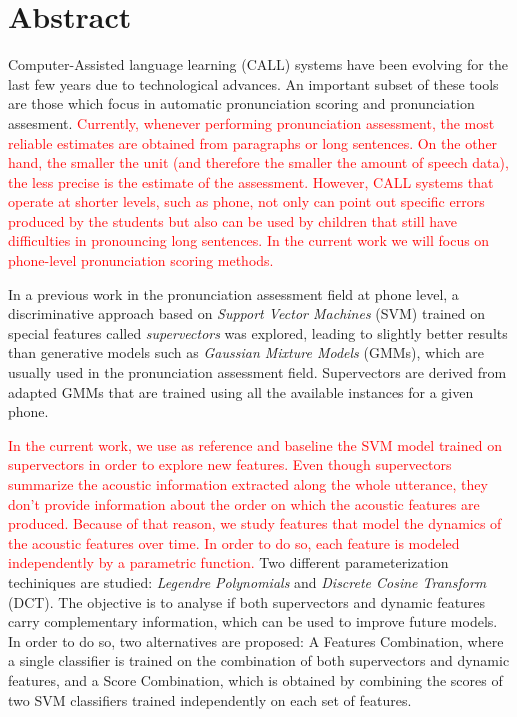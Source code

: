 \chapter*{Abstract}

\noindent
Computer-Assisted language learning (CALL) systems have been
evolving for the last few years due to
technological advances. An important subset of these tools are those which focus in
automatic pronunciation scoring and pronunciation assesment.
\textcolor{red}{
  Currently, whenever performing pronunciation assessment, the most reliable estimates are
  obtained from paragraphs or long sentences. On the other hand, the smaller the unit
  (and therefore the smaller the amount of speech data), the less precise is
  the estimate of the assessment.
  However, CALL systems that operate at shorter levels, such
  as phone, not only can point out specific errors produced by the students but also
  can be used by children that still have difficulties in pronouncing long sentences.
  In the current work we will focus on phone-level pronunciation scoring methods.
}

In a previous work in the pronunciation assessment field at phone level, a discriminative
approach based on \textit{Support Vector Machines} (SVM) trained on special features
called \textit{supervectors} was explored, leading to slightly better results than
generative models such as \textit{Gaussian Mixture Models} (GMMs), which are usually
used in the pronunciation assessment field. Supervectors are derived from
adapted GMMs that are trained using all the available instances for a given phone.

\textcolor{red}{
In the current work, we use as reference and baseline the SVM model
trained on supervectors in order to explore new features. Even though supervectors
summarize the acoustic information extracted along the whole utterance,
they don't provide information about the order on which the acoustic features are
produced. Because of that reason, we study features that model the dynamics of the
acoustic features over time. In order to do so, each feature is modeled independently
by a parametric function.}
Two different parameterization techiniques are studied:
\textit{Legendre Polynomials} and \textit{Discrete Cosine Transform} (DCT).
The objective is to analyse if both supervectors and dynamic features carry
complementary information, which can be used to improve future models. In order to do
so, two alternatives are proposed: A Features Combination, where a single classifier
is trained on the combination of both supervectors and dynamic features, and a
Score Combination, which is obtained by combining the scores of two SVM classifiers
trained independently on each set of features.

